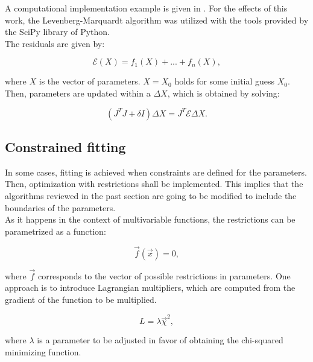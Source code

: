 \documentclass[openany]{book}
\begin{document}
A computational implementation example is given in  \cite{ramadasan_chevaldonne_chateau_2017}. For the effects of this work, the Levenberg-Marquardt algorithm was utilized with the tools provided by the SciPy library of Python.  \\

The residuals are given by:

\begin{equation}\label{eq:unconstrained_fitting_residuals}
	\mathcal{E}(X) = f_1(X) + ... + f_n(X),
\end{equation}

where $X$ is the vector of parameters. $X = X_0$ holds for some initial guess $X_0$. Then, parameters are updated within a $\Delta X$, which is obtained by solving:


\begin{equation}\label{eq:unconstrained_LevenbergMarquardt}
	(J^{T}J + \delta I)\Delta X = J^{T} \mathcal{E} \Delta X.
\end{equation}

\subsection{Constrained fitting} \label{sub:constrainedFitting}

In some cases, fitting is achieved when constraints are defined for the parameters. Then, optimization with restrictions shall be implemented. This implies that the algorithms reviewed in the past section are going to be modified to include the boundaries of the parameters. \\

As it happens in the context of multivariable functions, the restrictions can be parametrized as a function:

\begin{equation}\label{eq:fittingRestrictions}
	\vec f(\vec x) = 0,
\end{equation}

where $\vec f$ corresponds to the vector of possible restrictions in parameters. One approach is to introduce Lagrangian multipliers, which are computed from the gradient of the function to be multiplied.
 
\begin{equation}\label{eq:fittingLagrangeMultiplier}
	L = \lambda \vec \chi^2,
\end{equation}

where $\lambda$ is a parameter to be adjusted in favor of obtaining the chi-squared minimizing function. \\
\end{document}
